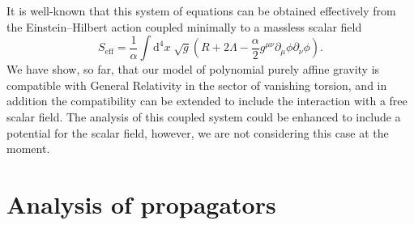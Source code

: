 \documentclass[aps,prd,12pt,twocolumn,superscriptaddress,showpacs,showkeys,reprint%
]{revtex4-1}
\newcommand\pa[1]{\partial_{{#1}}}
\renewcommand{\(}{\left(}
\renewcommand{\)}{\right)}
\renewcommand{\[}{\left[}
\renewcommand{\]}{\right]}
\newcommand{\dn}[2]{{\mathrm{d}}^{#1}{#2}\;}
\begin{document}
It is well-known that this system of equations can be obtained effectively from the Einstein--Hilbert action coupled minimally to a massless scalar field
\begin{equation}
  S_{\text{eff}} = \frac{1}{\alpha} \int \dn{4}{x} \sqrt{g} \left( R + 2 \Lambda - \frac{\alpha}{2} g^{\mu\nu} \pa{\mu}\phi \pa{\nu} \phi \right).
\end{equation}
We have show, so far, that our model of polynomial purely affine gravity is compatible with General Relativity in the sector of vanishing torsion, and in addition the compatibility can be extended to include the interaction with a free scalar field. The analysis of this coupled system could be enhanced to include a potential for the scalar field, however, we are not considering this case at the moment.


\section{\label{propag}Analysis of propagators}
\end{document}
